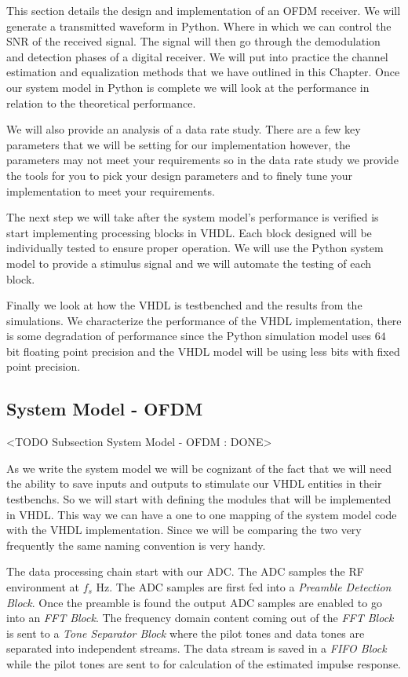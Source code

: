 This section details the design and implementation of an \ac{OFDM} receiver. We will generate a transmitted waveform in Python. Where in which we can control the \ac{SNR} of the received signal. The signal will then go through the demodulation and detection phases of a digital receiver. We will put into practice the channel estimation and equalization methods that we have outlined in this Chapter. Once our system model in Python is complete we will look at the performance in relation to the theoretical performance.

We will also provide an analysis of a data rate study. There are a few key parameters that we will be setting for our implementation however, the parameters may not meet your requirements so in the data rate study we provide the tools for you to pick your design parameters and to finely tune your implementation to meet your requirements.

The next step we will take after the system model's performance is verified is start implementing processing blocks in \ac{VHDL}. Each block designed will be individually tested to ensure proper operation. We will use the Python system model to provide a stimulus signal and we will automate the testing of each block.

Finally we look at how the \ac{VHDL} is testbenched and the results from the simulations. We characterize the performance of the \ac{VHDL} implementation, there is some degradation of performance since the Python simulation model uses $64$ bit floating point precision and the \ac{VHDL} model will be using less bits with fixed point precision.

\subsection{System Model - OFDM}
 <TODO Subsection System Model - OFDM : DONE>

As we write the system model we will be cognizant of the fact that we will need the ability to save inputs and outputs to stimulate our \ac{VHDL} entities in their testbenchs. So we will start with defining the modules that will be implemented in \ac{VHDL}. This way we can have a one to one mapping of the system model code with the \ac{VHDL} implementation. Since we will be comparing the two very frequently the same naming convention is very handy.

The data processing chain start with our \ac{ADC}. The \ac{ADC} samples the \ac{RF} environment at $f_s$ \ac{Hz}. The \ac{ADC} samples are first fed into a \emph{Preamble Detection Block}. Once the preamble is found the output \ac{ADC} samples are enabled to go into an \emph{\ac{FFT} Block}. The frequency domain content coming out of the \emph{\ac{FFT} Block} is sent to a \emph{Tone Separator Block} where the pilot tones and data tones are separated into independent streams. The data stream is saved in a \emph{\ac{FIFO} Block} while the pilot tones are sent to for calculation of the estimated impulse response.

